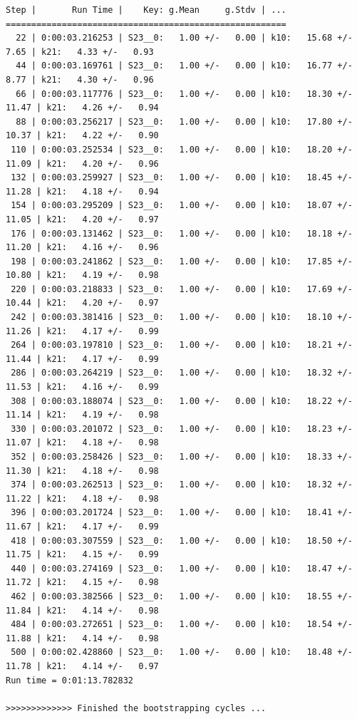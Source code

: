 \documentclass[a4paper,11pt,DIV=15,openany]{scrbook}
\begin{document}
\begin{oframed}
\begin{Verbatim}[commandchars=\\\{\}]
Step |       Run Time |    Key: g.Mean     g.Stdv | ...
=======================================================
  22 | 0:00:03.216253 | S23__0:   1.00 +/-   0.00 | k10:   15.68 +/-   7.65 | k21:   4.33 +/-   0.93 
  44 | 0:00:03.169761 | S23__0:   1.00 +/-   0.00 | k10:   16.77 +/-   8.77 | k21:   4.30 +/-   0.96 
  66 | 0:00:03.117776 | S23__0:   1.00 +/-   0.00 | k10:   18.30 +/-  11.47 | k21:   4.26 +/-   0.94 
  88 | 0:00:03.256217 | S23__0:   1.00 +/-   0.00 | k10:   17.80 +/-  10.37 | k21:   4.22 +/-   0.90 
 110 | 0:00:03.252534 | S23__0:   1.00 +/-   0.00 | k10:   18.20 +/-  11.09 | k21:   4.20 +/-   0.96 
 132 | 0:00:03.259927 | S23__0:   1.00 +/-   0.00 | k10:   18.45 +/-  11.28 | k21:   4.18 +/-   0.94 
 154 | 0:00:03.295209 | S23__0:   1.00 +/-   0.00 | k10:   18.07 +/-  11.05 | k21:   4.20 +/-   0.97 
 176 | 0:00:03.131462 | S23__0:   1.00 +/-   0.00 | k10:   18.18 +/-  11.20 | k21:   4.16 +/-   0.96 
 198 | 0:00:03.241862 | S23__0:   1.00 +/-   0.00 | k10:   17.85 +/-  10.80 | k21:   4.19 +/-   0.98 
 220 | 0:00:03.218833 | S23__0:   1.00 +/-   0.00 | k10:   17.69 +/-  10.44 | k21:   4.20 +/-   0.97 
 242 | 0:00:03.381416 | S23__0:   1.00 +/-   0.00 | k10:   18.10 +/-  11.26 | k21:   4.17 +/-   0.99 
 264 | 0:00:03.197810 | S23__0:   1.00 +/-   0.00 | k10:   18.21 +/-  11.44 | k21:   4.17 +/-   0.99 
 286 | 0:00:03.264219 | S23__0:   1.00 +/-   0.00 | k10:   18.32 +/-  11.53 | k21:   4.16 +/-   0.99 
 308 | 0:00:03.188074 | S23__0:   1.00 +/-   0.00 | k10:   18.22 +/-  11.14 | k21:   4.19 +/-   0.98 
 330 | 0:00:03.201072 | S23__0:   1.00 +/-   0.00 | k10:   18.23 +/-  11.07 | k21:   4.18 +/-   0.98 
 352 | 0:00:03.258426 | S23__0:   1.00 +/-   0.00 | k10:   18.33 +/-  11.30 | k21:   4.18 +/-   0.98 
 374 | 0:00:03.262513 | S23__0:   1.00 +/-   0.00 | k10:   18.32 +/-  11.22 | k21:   4.18 +/-   0.98 
 396 | 0:00:03.201724 | S23__0:   1.00 +/-   0.00 | k10:   18.41 +/-  11.67 | k21:   4.17 +/-   0.99 
 418 | 0:00:03.307559 | S23__0:   1.00 +/-   0.00 | k10:   18.50 +/-  11.75 | k21:   4.15 +/-   0.99 
 440 | 0:00:03.274169 | S23__0:   1.00 +/-   0.00 | k10:   18.47 +/-  11.72 | k21:   4.15 +/-   0.98 
 462 | 0:00:03.382566 | S23__0:   1.00 +/-   0.00 | k10:   18.55 +/-  11.84 | k21:   4.14 +/-   0.98 
 484 | 0:00:03.272651 | S23__0:   1.00 +/-   0.00 | k10:   18.54 +/-  11.88 | k21:   4.14 +/-   0.98 
 500 | 0:00:02.428860 | S23__0:   1.00 +/-   0.00 | k10:   18.48 +/-  11.78 | k21:   4.14 +/-   0.97 
Run time = 0:01:13.782832

>>>>>>>>>>>>> Finished the bootstrapping cycles ...










\end{Verbatim}
\end{oframed}
\end{document}

